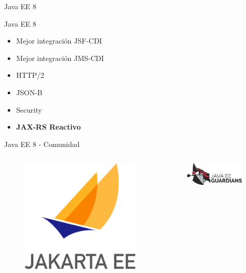 \documentclass{beamer}
\begin{document}
\begin{frame}{Java EE 8}
\begin{alertblock}{Java EE 8}
\begin{itemize}
	\item Mejor integración JSF-CDI
	\item Mejor integración JMS-CDI
	\item HTTP/2
	\item JSON-B
	\item Security
	\item \textbf{JAX-RS Reactivo}
\end{itemize}
\end{alertblock}
\end{frame}


\begin{frame}{Java EE 8 - Comunidad}
\begin{columns}
\begin{column}{0.5\textwidth}
	\begin{figure}
		\centering
		\includegraphics[width=0.7\linewidth]{Images/jakartaee}
	\end{figure}
	\end{column}
	\begin{column}{0.5\textwidth}  %
		\begin{figure}
			\centering
			\includegraphics[width=\linewidth]{Images/guardians}
		\end{figure}
	\end{column}
\end{columns}


\end{frame}
\end{document}
